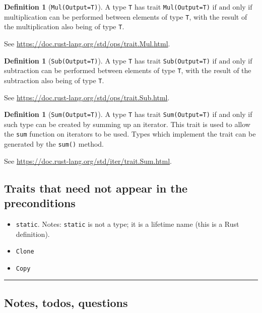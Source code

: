 \documentclass[11pt,a4paper]{article}
\theoremstyle{definition}
\newtheorem{definition}[theorem]{Definition}
\newcommand{\horizline}{\noindent\rule{\textwidth}{1pt}}
\newcommand{\inRust}[2]{See \url{#2}.}
\newcommand{\iffText}{\text{if and only if}}
\begin{document}
\begin{definition}[\texttt{Mul(Output=T)}]
    A type \texttt{T} has trait \texttt{Mul(Output=T)} $\iffText$ multiplication can be performed between elements of type \texttt{T}, with the result of the multiplication also being of type \texttt{T}.
    
    \inRust{Trait std::ops::Mul}{https://doc.rust-lang.org/std/ops/trait.Mul.html}
\end{definition}

\begin{definition}[\texttt{Sub(Output=T)}]
\label{defn:trait-sub}
    A type \texttt{T} has trait \texttt{Sub(Output=T)} $\iffText$ subtraction can be performed between elements of type \texttt{T}, with the result of the subtraction also being of type \texttt{T}.
    
    \inRust{Trait std::ops::Sub}{https://doc.rust-lang.org/std/ops/trait.Sub.html}
\end{definition}

\begin{definition}[\texttt{Sum(Output=T)}]
    A type \texttt{T} has trait \texttt{Sum(Output=T)} if and only if such type can be created by summing up an iterator. This trait is used to allow the \texttt{sum} function on iterators to be used. Types which implement the trait can be generated by the \texttt{sum()} method.
    
    \inRust{Trait std::iter::Sum}{https://doc.rust-lang.org/std/iter/trait.Sum.html}
\end{definition}

\subsection{Traits that need not appear in the preconditions}
\begin{itemize}
    \item \texttt{\textquotesingle static}. Notes: \texttt{\textquotesingle static} is not a type; it is a lifetime name (this is a Rust definition).
    \item \texttt{Clone}
    \item \texttt{Copy}
\end{itemize}

\horizline

\subsection{Notes, todos, questions}
\end{document}
